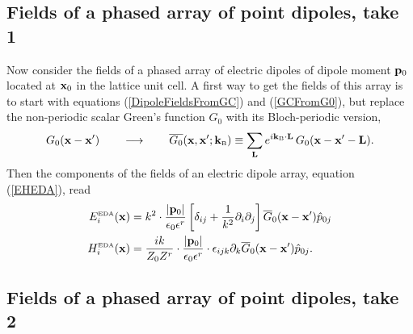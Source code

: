 \documentclass[letterpaper]{article}
\begin{document}
\subsection*{Fields of a phased array of point dipoles, take 1}

Now consider the fields of a phased array of electric dipoles
of dipole moment $\mathbf{p}_0$ located at $\mathbf{x}_0$ in the lattice 
unit cell.
A first way to get the fields of this array is 
to start with equations (\ref{DipoleFieldsFromGC}) and
(\ref{GCFromG0}), but replace the non-periodic scalar
Green's function $G_0$ with its Bloch-periodic version,
$$ G_0(\mathbf{x}-\mathbf{x}^\prime) \qquad \longrightarrow \qquad 
   \overline{G_0}(\mathbf{x}, \mathbf{x}^\prime; \mathbf{k}_{\hbox{\tiny{B}}}) \equiv
   \sum_{\mathbf{L}} e^{i \mathbf{k}_{\hbox{\tiny{B}}} \cdot \mathbf{L}} \, G_0(\mathbf{x}- \mathbf{x}^\prime-\mathbf{L}).
$$
Then the components of the fields of an electric dipole array, 
equation (\ref{EHEDA}), read
\begin{align*}
 E_i^{\hbox{\tiny{EDA}}}(\mathbf{x})
 &=k^2 \cdot \frac{|\mathbf{p}_0|}{\epsilon_0 \epsilon^r } 
    \left[ \delta_{ij} + \frac{1}{k^2}\partial_i \partial_j
    \right] \overline{G}_{0}(\mathbf{x}-\mathbf{x}^\prime)\hat{p}_{0j}
\\
 H_i^{\hbox{\tiny{EDA}}}(\mathbf{x})
 &=\frac{ik}{Z_0 Z^r}
    \cdot \frac{|\mathbf{p}_0|}{\epsilon_0 \epsilon^r } \cdot
    \epsilon_{ijk} \partial_k \overline{G}_{0}(\mathbf{x}-\mathbf{x}^\prime)
    \hat{p}_{0j}.
\end{align*}

\subsection*{Fields of a phased array of point dipoles, take 2}
\end{document}
